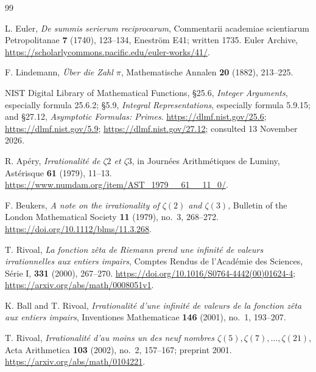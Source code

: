 \documentclass[11pt,letterpaper]{article}
\theoremstyle{definition}
\begin{document}
\begingroup
\raggedright
\begin{thebibliography}{99}

L. Euler, \emph{De summis serierum reciprocarum}, Commentarii academiae
scientiarum Petropolitanae \textbf{7} (1740), 123--134, Enestr\"om E41;
written 1735.  Euler Archive,
\url{https://scholarlycommons.pacific.edu/euler-works/41/}.

F. Lindemann, \emph{\"Uber die Zahl $\pi$}, Mathematische Annalen
\textbf{20} (1882), 213--225.

NIST Digital Library of Mathematical Functions, \S25.6, \emph{Integer
Arguments}, especially formula 25.6.2;
\S5.9, \emph{Integral Representations}, especially formula 5.9.15;
and \S27.12, \emph{Asymptotic Formulas: Primes}.
\url{https://dlmf.nist.gov/25.6};
\url{https://dlmf.nist.gov/5.9};
\url{https://dlmf.nist.gov/27.12}; consulted 13 November 2026.

R. Ap\'ery, \emph{Irrationalit\'e de $\zeta 2$ et $\zeta 3$}, in
Journ\'ees Arithm\'etiques de Luminy, Ast\'erisque \textbf{61} (1979),
11--13. \url{https://www.numdam.org/item/AST_1979__61__11_0/}.

F. Beukers, \emph{A note on the irrationality of $\zeta(2)$ and
$\zeta(3)$}, Bulletin of the London Mathematical Society \textbf{11}
(1979), no.~3, 268--272. \url{https://doi.org/10.1112/blms/11.3.268}.

T. Rivoal, \emph{La fonction z\^eta de Riemann prend une infinit\'e de
valeurs irrationnelles aux entiers impairs}, Comptes Rendus de
l'Acad\'emie des Sciences, S\'erie I, \textbf{331} (2000), 267--270.
\url{https://doi.org/10.1016/S0764-4442(00)01624-4};
\url{https://arxiv.org/abs/math/0008051v1}.

K. Ball and T. Rivoal, \emph{Irrationalit\'e d'une infinit\'e de valeurs
de la fonction z\^eta aux entiers impairs}, Inventiones Mathematicae
\textbf{146} (2001), no.~1, 193--207.

T. Rivoal, \emph{Irrationalit\'e d'au moins un des neuf nombres
$\zeta(5),\zeta(7),\ldots,\zeta(21)$}, Acta Arithmetica \textbf{103}
(2002), no.~2, 157--167; preprint 2001.
\url{https://arxiv.org/abs/math/0104221}.


\end{thebibliography}
\end{document}
